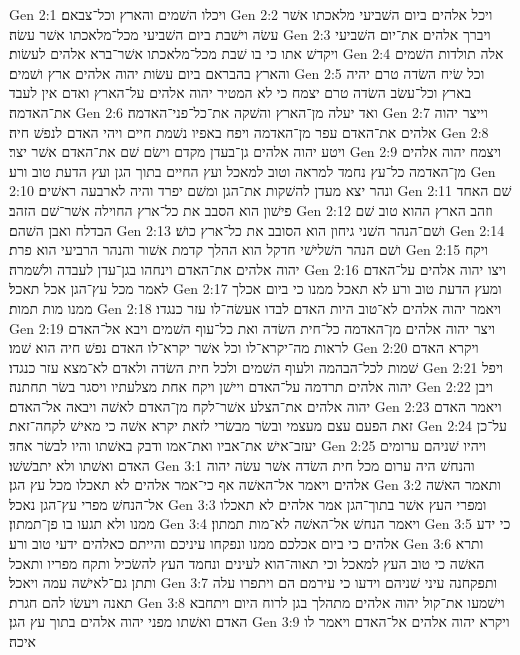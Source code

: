 Gen 2:1  ויכלו השׁמים והארץ וכל־צבאם׃
Gen 2:2  ויכל אלהים ביום השׁביעי מלאכתו אשׁר עשׂה וישׁבת ביום השׁביעי מכל־מלאכתו אשׁר עשׂה׃
Gen 2:3  ויברך אלהים את־יום השׁביעי ויקדשׁ אתו כי בו שׁבת מכל־מלאכתו אשׁר־ברא אלהים לעשׂות׃
Gen 2:4  אלה תולדות השׁמים והארץ בהבראם ביום עשׂות יהוה אלהים ארץ ושׁמים׃
Gen 2:5  וכל שׂיח השׂדה טרם יהיה בארץ וכל־עשׂב השׂדה טרם יצמח כי לא המטיר יהוה אלהים על־הארץ ואדם אין לעבד את־האדמה׃
Gen 2:6  ואד יעלה מן־הארץ והשׁקה את־כל־פני־האדמה׃
Gen 2:7  וייצר יהוה אלהים את־האדם עפר מן־האדמה ויפח באפיו נשׁמת חיים ויהי האדם לנפשׁ חיה׃
Gen 2:8  ויטע יהוה אלהים גן־בעדן מקדם וישׂם שׁם את־האדם אשׁר יצר׃
Gen 2:9  ויצמח יהוה אלהים מן־האדמה כל־עץ נחמד למראה וטוב למאכל ועץ החיים בתוך הגן ועץ הדעת טוב ורע׃
Gen 2:10  ונהר יצא מעדן להשׁקות את־הגן ומשׁם יפרד והיה לארבעה ראשׁים׃
Gen 2:11  שׁם האחד פישׁון הוא הסבב את כל־ארץ החוילה אשׁר־שׁם הזהב׃
Gen 2:12  וזהב הארץ ההוא טוב שׁם הבדלח ואבן השׁהם׃
Gen 2:13  ושׁם־הנהר השׁני גיחון הוא הסובב את כל־ארץ כושׁ׃
Gen 2:14  ושׁם הנהר השׁלישׁי חדקל הוא ההלך קדמת אשׁור והנהר הרביעי הוא פרת׃
Gen 2:15  ויקח יהוה אלהים את־האדם וינחהו בגן־עדן לעבדה ולשׁמרה׃
Gen 2:16  ויצו יהוה אלהים על־האדם לאמר מכל עץ־הגן אכל תאכל׃
Gen 2:17  ומעץ הדעת טוב ורע לא תאכל ממנו כי ביום אכלך ממנו מות תמות׃
Gen 2:18  ויאמר יהוה אלהים לא־טוב היות האדם לבדו אעשׂה־לו עזר כנגדו׃
Gen 2:19  ויצר יהוה אלהים מן־האדמה כל־חית השׂדה ואת כל־עוף השׁמים ויבא אל־האדם לראות מה־יקרא־לו וכל אשׁר יקרא־לו האדם נפשׁ חיה הוא שׁמו׃
Gen 2:20  ויקרא האדם שׁמות לכל־הבהמה ולעוף השׁמים ולכל חית השׂדה ולאדם לא־מצא עזר כנגדו׃
Gen 2:21  ויפל יהוה אלהים תרדמה על־האדם ויישׁן ויקח אחת מצלעתיו ויסגר בשׂר תחתנה׃
Gen 2:22  ויבן יהוה אלהים את־הצלע אשׁר־לקח מן־האדם לאשׁה ויבאה אל־האדם׃
Gen 2:23  ויאמר האדם זאת הפעם עצם מעצמי ובשׂר מבשׂרי לזאת יקרא אשׁה כי מאישׁ לקחה־זאת׃
Gen 2:24  על־כן יעזב־אישׁ את־אביו ואת־אמו ודבק באשׁתו והיו לבשׂר אחד׃
Gen 2:25  ויהיו שׁניהם ערומים האדם ואשׁתו ולא יתבשׁשׁו׃
Gen 3:1  והנחשׁ היה ערום מכל חית השׂדה אשׁר עשׂה יהוה אלהים ויאמר אל־האשׁה אף כי־אמר אלהים לא תאכלו מכל עץ הגן׃
Gen 3:2  ותאמר האשׁה אל־הנחשׁ מפרי עץ־הגן נאכל׃
Gen 3:3  ומפרי העץ אשׁר בתוך־הגן אמר אלהים לא תאכלו ממנו ולא תגעו בו פן־תמתון׃
Gen 3:4  ויאמר הנחשׁ אל־האשׁה לא־מות תמתון׃
Gen 3:5  כי ידע אלהים כי ביום אכלכם ממנו ונפקחו עיניכם והייתם כאלהים ידעי טוב ורע׃
Gen 3:6  ותרא האשׁה כי טוב העץ למאכל וכי תאוה־הוא לעינים ונחמד העץ להשׂכיל ותקח מפריו ותאכל ותתן גם־לאישׁה עמה ויאכל׃
Gen 3:7  ותפקחנה עיני שׁניהם וידעו כי עירמם הם ויתפרו עלה תאנה ויעשׂו להם חגרת׃
Gen 3:8  וישׁמעו את־קול יהוה אלהים מתהלך בגן לרוח היום ויתחבא האדם ואשׁתו מפני יהוה אלהים בתוך עץ הגן׃
Gen 3:9  ויקרא יהוה אלהים אל־האדם ויאמר לו איכה׃
